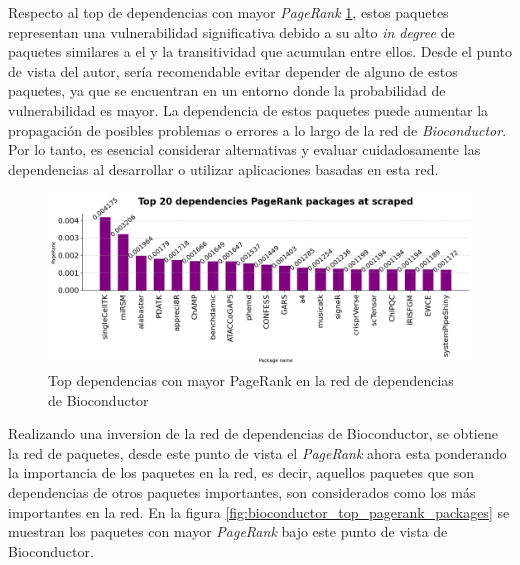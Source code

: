 Respecto al top de dependencias con mayor \textit{PageRank} \ref{fig:bioconductor_top_pagerank_dependencies},
estos paquetes representan una vulnerabilidad significativa debido a su alto \textit{in degree} de paquetes similares a el
y la transitividad que acumulan entre ellos. Desde el punto de vista
del autor, sería recomendable evitar depender de alguno de estos paquetes, ya que se encuentran en un entorno
donde la probabilidad de vulnerabilidad es mayor. La dependencia de estos paquetes puede aumentar la propagación
de posibles problemas o errores a lo largo de la red de \textit{Bioconductor}. Por lo tanto, es esencial
considerar alternativas y evaluar cuidadosamente las dependencias al desarrollar o utilizar aplicaciones
basadas en esta red.

\begin{figure}[ht!]
    \begin{center}
        \includegraphics[width=1\textwidth]{img/bioconductor/top_pagerrank_dependencies.png}
        \caption{Top dependencias con mayor PageRank en la red de dependencias de Bioconductor}
        \label{fig:bioconductor_top_pagerank_dependencies}
    \end{center}
\end{figure}

Realizando una inversion de la red de dependencias de Bioconductor, se obtiene la red de paquetes, desde este punto de vista
el \textit{PageRank} ahora esta ponderando la importancia de los paquetes en la red, es decir, aquellos paquetes que son dependencias
de otros paquetes importantes, son considerados como los más importantes en la red. En la figura \ref{fig:bioconductor_top_pagerank_packages}
se muestran los paquetes con mayor \textit{PageRank} bajo este punto de vista de Bioconductor.

